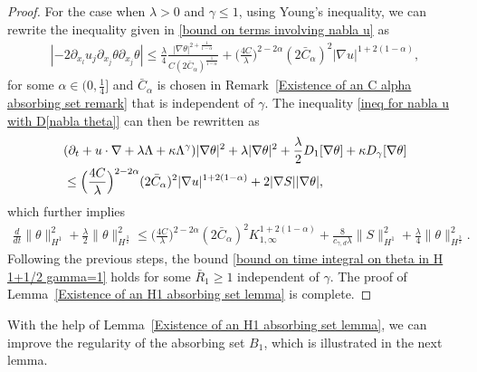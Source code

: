 \documentclass[reqno]{amsart}%
\theoremstyle{definition}
\theoremstyle{remark}
\numberwithin{equation}{section}
\newcommand{\dt}{\partial_t}
\newcommand{\1}{\mathbf{1}}
\numberwithin{equation}{section}
\numberwithin{theorem}{section}
\numberwithin{figure}{section}
\begin{document}
\begin{proof}
For the case when $\lambda>0$ and $\gamma\le1$, using Young's inequality, we can rewrite the inequality given in \eqref{bound on terms involving nabla u} as
\begin{align*}
|-2\partial_{x_l} u_j\partial_{x_j}\theta\partial_{x_j}\theta|\le \frac{\lambda}{4}\frac{|\nabla\theta|^{2+\frac{1}{1-\alpha}}}{C(2\bar{C}_\alpha)^\frac{1}{1-\alpha}}+\Big(\frac{4C}{\lambda}\Big)^{2-2\alpha}(2\bar{C}_\alpha)^2|\nabla u|^{1+2(1-\alpha)},
\end{align*}
for some $\alpha\in(0,\frac{1}{4}]$ and $\bar{C}_\alpha$ is chosen in Remark~\ref{Existence of an C alpha absorbing set remark} that is independent of $\gamma$. The inequality \eqref{ineq for nabla u with D[nabla theta]} can then be rewritten as
\begin{align*}
&(\dt+u\cdot\nabla+\lambda\Lambda+\kappa\Lambda^\gamma)|\nabla\theta|^2+\lambda|\nabla\theta|^2+\frac{\lambda}{2} D_{1}[\nabla\theta]+\kappa D_{\gamma}[\nabla\theta]\notag\\
&\le\Big(\frac{4C}{\lambda}\Big)^{2-2\alpha}(2\bar{C}_\alpha)^2|\nabla u|^{1+2(1-\alpha)}+2|\nabla S||\nabla \theta|,
\end{align*}
which further implies
\begin{align*}
\frac{d}{dt}\|\theta\|^2_{H^1}+\frac{\lambda}{2}\|\theta\|^2_{H^{\frac{3}{2}}}
\le\Big(\frac{4C}{\lambda}\Big)^{2-2\alpha}(2\bar{C}_\alpha)^2K_{1,\infty}^{1+2(1-\alpha)}+\frac{8}{c_{\gamma,d}\lambda}\|S\|^2_{H^1}+\frac{\lambda}{4}\|\theta\|^2_{H^\frac{3}{2}}.
\end{align*}
Following the previous steps, the bound \eqref{bound on time integral on theta in H 1+1/2 gamma=1} holds for some $\bar{R}_1\ge1$ independent of $\gamma$. The proof of Lemma~\ref{Existence of an H1 absorbing set lemma} is complete.
\end{proof}

With the help of Lemma~\ref{Existence of an H1 absorbing set lemma}, we can improve the regularity of the absorbing set $B_1$, which is illustrated in the next lemma. 
\end{document}
